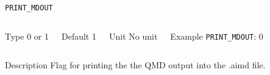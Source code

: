 \begin{frame}[allowframebreaks]{\texttt{PRINT\_MDOUT}} \label{PRINT_MDOUT}
\vspace*{-12pt}
\begin{columns}
\begin{block}{Type}
0 or 1
\end{block}

\begin{block}{Default}
1
\end{block}

\begin{block}{Unit}
No unit
\end{block}

\begin{block}{Example}
\texttt{PRINT\_MDOUT}: 0
\end{block}
\end{columns}

\begin{block}{Description}
Flag for printing the the QMD output into the .aimd file. 
\end{block}


\end{frame}






